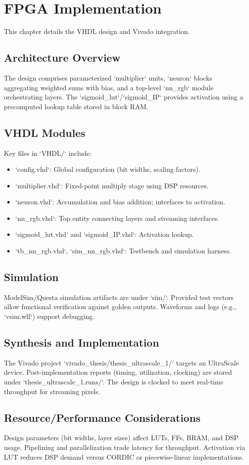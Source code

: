 \chapter{FPGA Implementation}\label{chap:fpga-impl}
This chapter details the VHDL design and Vivado integration.

\section{Architecture Overview}
The design comprises parameterized `multiplier` units, `neuron` blocks aggregating weighted sums with bias, and a top-level `nn\_rgb` module orchestrating layers. The `sigmoid\_lut`/`sigmoid\_IP` provides activation using a precomputed lookup table stored in block RAM.

\section{VHDL Modules}
Key files in `VHDL/` include:
\begin{itemize}
    \item `config.vhd`: Global configuration (bit widths, scaling factors).
    \item `multiplier.vhd`: Fixed-point multiply stage using DSP resources.
    \item `neuron.vhd`: Accumulation and bias addition; interfaces to activation.
    \item `nn\_rgb.vhd`: Top entity connecting layers and streaming interfaces.
    \item `sigmoid\_lut.vhd` and `sigmoid\_IP.vhd`: Activation lookup.
    \item `tb\_nn\_rgb.vhd`, `sim\_nn\_rgb.vhd`: Testbench and simulation harness.
\end{itemize}

\section{Simulation}
ModelSim/Questa simulation artifacts are under `sim/`. Provided test vectors allow functional verification against golden outputs. Waveforms and logs (e.g., `vsim.wlf`) support debugging.

\section{Synthesis and Implementation}
The Vivado project `vivado_thesis/thesis_ultrascale_1/` targets an UltraScale device. Post-implementation reports (timing, utilization, clocking) are stored under `thesis_ultrascale_1.runs/`. The design is clocked to meet real-time throughput for streaming pixels.

\section{Resource/Performance Considerations}
Design parameters (bit widths, layer sizes) affect LUTs, FFs, BRAM, and DSP usage. Pipelining and parallelization trade latency for throughput. Activation via LUT reduces DSP demand versus CORDIC or piecewise-linear implementations.
